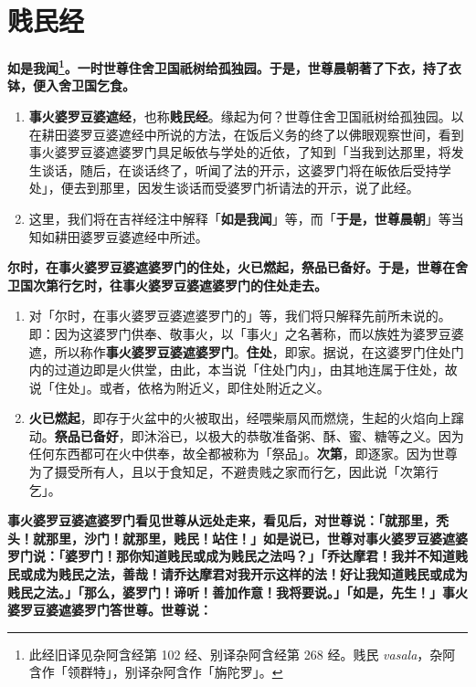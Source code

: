 \section{贱民经}

\textbf{如是我闻\footnote{此经旧译见杂阿含经第 102 经、别译杂阿含经第 268 经。贱民 \textit{vasala}，杂阿含作「领群特」，别译杂阿含作「旃陀罗」。}。一时世尊住舍卫国祇树给孤独园。于是，世尊晨朝著了下衣，持了衣钵，便入舍卫国乞食。}

\begin{enumerate}\item \textbf{事火婆罗豆婆遮经}，也称\textbf{贱民经}。缘起为何？世尊住舍卫国祇树给孤独园。以在耕田婆罗豆婆遮经中所说的方法，在饭后义务的终了以佛眼观察世间，看到事火婆罗豆婆遮婆罗门具足皈依与学处的近依，了知到「当我到达那里，将发生谈话，随后，在谈话终了，听闻了法的开示，这婆罗门将在皈依后受持学处」，便去到那里，因发生谈话而受婆罗门祈请法的开示，说了此经。
\item 这里，我们将在吉祥经注中解释「\textbf{如是我闻}」等，而「\textbf{于是，世尊晨朝}」等当知如耕田婆罗豆婆遮经中所述。\end{enumerate}

\textbf{尔时，在事火婆罗豆婆遮婆罗门的住处，火已燃起，祭品已备好。于是，世尊在舍卫国次第行乞时，往事火婆罗豆婆遮婆罗门的住处走去。}

\begin{enumerate}\item 对「尔时，在事火婆罗豆婆遮婆罗门的」等，我们将只解释先前所未说的。即：因为这婆罗门供奉、敬事火，以「事火」之名著称，而以族姓为婆罗豆婆遮，所以称作\textbf{事火婆罗豆婆遮婆罗门}。\textbf{住处}，即家。据说，在这婆罗门住处门内的过道边即是火供堂，由此，本当说「住处门内」，由其地连属于住处，故说「住处」。或者，依格为附近义，即住处附近之义。
\item \textbf{火已燃起}，即存于火盆中的火被取出，经喂柴扇风而燃烧，生起的火焰向上蹿动。\textbf{祭品已备好}，即沐浴已，以极大的恭敬准备粥、酥、蜜、糖等之义。因为任何东西都可在火中供奉，故全都被称为「祭品」。\textbf{次第}，即逐家。因为世尊为了摄受所有人，且以于食知足，不避贵贱之家而行乞，因此说「次第行乞」。\end{enumerate}

\textbf{事火婆罗豆婆遮婆罗门看见世尊从远处走来，看见后，对世尊说：「就那里，秃头！就那里，沙门！就那里，贱民！站住！」如是说已，世尊对事火婆罗豆婆遮婆罗门说：「婆罗门！那你知道贱民或成为贱民之法吗？」「乔达摩君！我并不知道贱民或成为贱民之法，善哉！请乔达摩君对我开示这样的法！好让我知道贱民或成为贱民之法。」「那么，婆罗门！谛听！善加作意！我将要说。」「如是，先生！」事火婆罗豆婆遮婆罗门答世尊。世尊说：}


